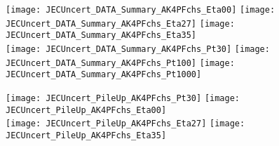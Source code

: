 \documentclass[landscape,10pt]{beamer} %
\begin{document}

\newpage

\begin{figure}[p]
\centering
  \texttt{[image: JECUncert\_DATA\_Summary\_AK4PFchs\_Eta00]}
  \texttt{[image: JECUncert\_DATA\_Summary\_AK4PFchs\_Eta27]}
  \texttt{[image: JECUncert\_DATA\_Summary\_AK4PFchs\_Eta35]}\\
  \texttt{[image: JECUncert\_DATA\_Summary\_AK4PFchs\_Pt30]}
  \texttt{[image: JECUncert\_DATA\_Summary\_AK4PFchs\_Pt100]}
  \texttt{[image: JECUncert\_DATA\_Summary\_AK4PFchs\_Pt1000]}
\end{figure}

\newpage

\begin{figure}[p]
\centering
  \texttt{[image: JECUncert\_PileUp\_AK4PFchs\_Pt30]}
  \texttt{[image: JECUncert\_PileUp\_AK4PFchs\_Eta00]}\\
  \texttt{[image: JECUncert\_PileUp\_AK4PFchs\_Eta27]}
  \texttt{[image: JECUncert\_PileUp\_AK4PFchs\_Eta35]}
\end{figure}
\end{document}
